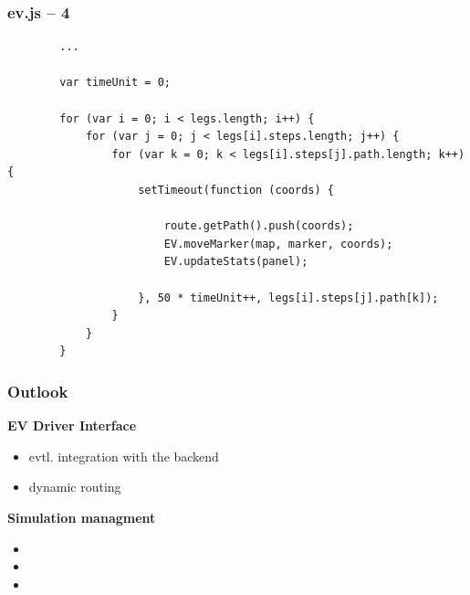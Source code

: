 \begin{frame}[fragile]
\frametitle{ev.js – 4}

\begin{verbatim}
        ...

        var timeUnit = 0;

        for (var i = 0; i < legs.length; i++) {
            for (var j = 0; j < legs[i].steps.length; j++) {
                for (var k = 0; k < legs[i].steps[j].path.length; k++) {
                    setTimeout(function (coords) {

                        route.getPath().push(coords);
                        EV.moveMarker(map, marker, coords);
                        EV.updateStats(panel);

                    }, 50 * timeUnit++, legs[i].steps[j].path[k]);
                }
            }
        }
\end{verbatim}

\end{frame}
\clearpage
{} 
\begin{frame}
	\frametitle{Outlook}
		\textbf{EV Driver Interface}
	\begin{itemize}
		\item	evtl. integration with the backend
		\item 	dynamic routing
	\end{itemize}
	
	\vspace{8mm}
	
	\textbf{Simulation managment}
	\begin{itemize}
		\item 
		\item 
		\item 
	\end{itemize}
	
\end{frame}
\clearpage